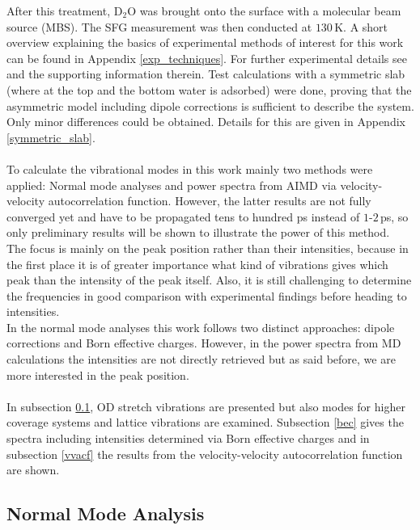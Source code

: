 \documentclass[11pt,DIV=13,BCOR=5mm,a4paper,headinclude]{scrbook}
\begin{document}
After this treatment, D$_2$O was brought onto the surface with a molecular beam source (MBS).
The SFG measurement was then conducted at $130\,$K.
A short overview explaining the basics of experimental methods of interest for this work can be found in Appendix \ref{exp_techniques}.
For further experimental details see \cite{Heiden11-20_2018} and the supporting information therein.
Test calculations with a symmetric slab (where at the top and the bottom water is adsorbed) were done, proving that the asymmetric model including dipole corrections is sufficient to describe the system.
Only minor differences could be obtained.
Details for this are given in Appendix \ref{symmetric_slab}.
\\
\\
To calculate the vibrational modes in this work mainly two methods were applied: Normal mode analyses and power spectra from AIMD via velocity-velocity autocorrelation function.
However, the latter results are not fully converged yet and have to be propagated tens to hundred ps instead of $1$-$2\,$ps, so only preliminary results will be shown to illustrate the power of this method.
\\
The focus is mainly on the peak position rather than their intensities, because in the first place it is of greater importance what kind of vibrations gives which peak than the intensity of the peak itself.
Also, it is still challenging to determine the frequencies in good comparison with experimental findings before heading to intensities.
\\
In the normal mode analyses this work follows two distinct approaches: dipole corrections and Born effective charges.
However, in the power spectra from MD calculations the intensities are not directly retrieved but as said before, we are more interested in the peak position.
\\\\
In subsection \ref{nma}, OD stretch vibrations are presented but also modes for higher coverage systems and lattice vibrations are examined.
Subsection \ref{bec} gives the spectra including intensities determined via Born effective charges and in subsection \ref{vvacf} the results from the velocity-velocity autocorrelation function are shown.

\subsection{Normal Mode Analysis}\label{nma}
\end{document}
